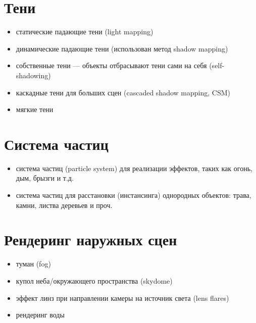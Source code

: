 \documentclass[a4paper,12pt,oneside]{sphinxmanual}
\begin{document}
\section{Тени}
\label{features:id5}\begin{itemize}
\item {} 
статические падающие тени (light mapping)

\item {} 
динамические падающие тени (использован метод shadow mapping)

\item {} 
собственные тени — объекты отбрасывают тени сами на себя (self-shadowing)

\item {} 
каскадные тени для больших сцен (cascaded shadow mapping, CSM)

\item {} 
мягкие тени

\end{itemize}


\section{Система частиц}
\label{features:id6}\begin{itemize}
\item {} 
система частиц (particle system) для реализации эффектов, таких как огонь, дым, брызги и т.д.

\item {} 
система частиц для расстановки (инстансинга) однородных объектов: трава, камни, листва деревьев и проч.

\end{itemize}


\section{Рендеринг наружных сцен}
\label{features:id7}\begin{itemize}
\item {} 
туман (fog)

\item {} 
купол неба/окружающего пространства (skydome)

\item {} 
эффект линз при направлении камеры на источник света (lens flares)

\item {} 
рендеринг воды

\end{itemize}
\end{document}
